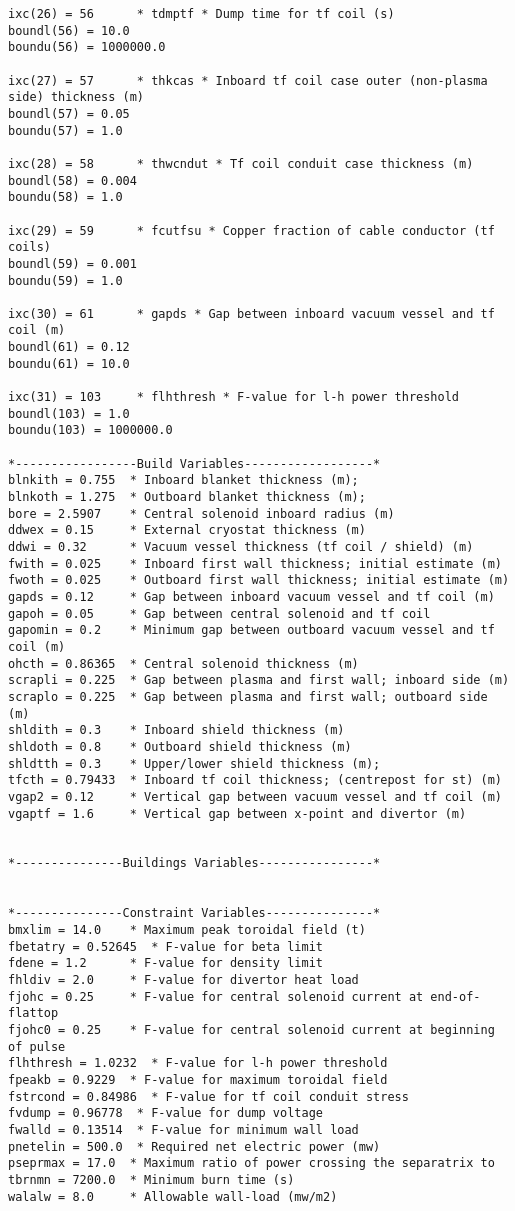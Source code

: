 \documentclass[11pt,a4paper]{report}
\begin{document}
\begin{verbatim}
ixc(26) = 56      * tdmptf * Dump time for tf coil (s)
boundl(56) = 10.0  
boundu(56) = 1000000.0  

ixc(27) = 57      * thkcas * Inboard tf coil case outer (non-plasma side) thickness (m)
boundl(57) = 0.05  
boundu(57) = 1.0  

ixc(28) = 58      * thwcndut * Tf coil conduit case thickness (m)
boundl(58) = 0.004  
boundu(58) = 1.0  

ixc(29) = 59      * fcutfsu * Copper fraction of cable conductor (tf coils)
boundl(59) = 0.001  
boundu(59) = 1.0  

ixc(30) = 61      * gapds * Gap between inboard vacuum vessel and tf coil (m)
boundl(61) = 0.12  
boundu(61) = 10.0  

ixc(31) = 103     * flhthresh * F-value for l-h power threshold
boundl(103) = 1.0  
boundu(103) = 1000000.0  

*-----------------Build Variables------------------*
blnkith = 0.755  * Inboard blanket thickness (m);
blnkoth = 1.275  * Outboard blanket thickness (m);
bore = 2.5907    * Central solenoid inboard radius (m)
ddwex = 0.15     * External cryostat thickness (m)
ddwi = 0.32      * Vacuum vessel thickness (tf coil / shield) (m)
fwith = 0.025    * Inboard first wall thickness; initial estimate (m)
fwoth = 0.025    * Outboard first wall thickness; initial estimate (m)
gapds = 0.12     * Gap between inboard vacuum vessel and tf coil (m)
gapoh = 0.05     * Gap between central solenoid and tf coil
gapomin = 0.2    * Minimum gap between outboard vacuum vessel and tf coil (m)
ohcth = 0.86365  * Central solenoid thickness (m)
scrapli = 0.225  * Gap between plasma and first wall; inboard side (m)
scraplo = 0.225  * Gap between plasma and first wall; outboard side (m)
shldith = 0.3    * Inboard shield thickness (m)
shldoth = 0.8    * Outboard shield thickness (m)
shldtth = 0.3    * Upper/lower shield thickness (m);
tfcth = 0.79433  * Inboard tf coil thickness; (centrepost for st) (m)
vgap2 = 0.12     * Vertical gap between vacuum vessel and tf coil (m)
vgaptf = 1.6     * Vertical gap between x-point and divertor (m)


*---------------Buildings Variables----------------*


*---------------Constraint Variables---------------*
bmxlim = 14.0    * Maximum peak toroidal field (t)
fbetatry = 0.52645  * F-value for beta limit
fdene = 1.2      * F-value for density limit
fhldiv = 2.0     * F-value for divertor heat load
fjohc = 0.25     * F-value for central solenoid current at end-of-flattop
fjohc0 = 0.25    * F-value for central solenoid current at beginning of pulse
flhthresh = 1.0232  * F-value for l-h power threshold
fpeakb = 0.9229  * F-value for maximum toroidal field
fstrcond = 0.84986  * F-value for tf coil conduit stress
fvdump = 0.96778  * F-value for dump voltage
fwalld = 0.13514  * F-value for minimum wall load
pnetelin = 500.0  * Required net electric power (mw)
pseprmax = 17.0  * Maximum ratio of power crossing the separatrix to
tbrnmn = 7200.0  * Minimum burn time (s)
walalw = 8.0     * Allowable wall-load (mw/m2)



\end{verbatim}
\end{document}
